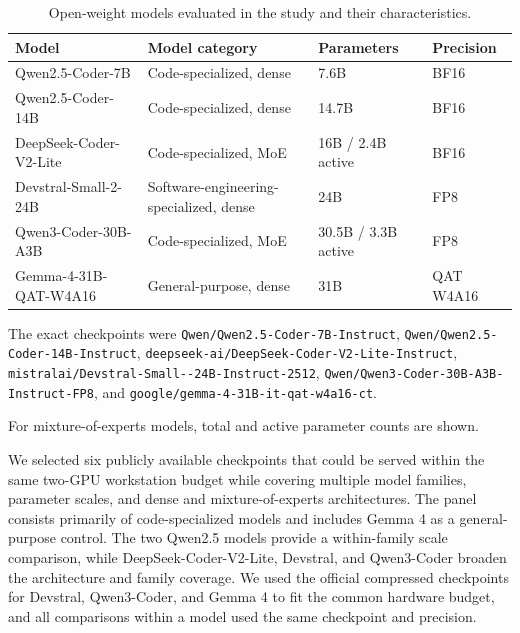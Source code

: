 \begin{table}[H]
\caption{Open-weight models evaluated in the study and their characteristics.}
\label{tab:models}
\centering
\begingroup
\scriptsize
\renewcommand{\arraystretch}{1.12}

\begin{threeparttable}

\begin{tabularx}{0.98\columnwidth}{
    >{\raggedright\arraybackslash}p{}
    >{\raggedright\arraybackslash}X
    >{\centering\arraybackslash}p{}
    >{\centering\arraybackslash}p{}
}
\toprule
\textbf{Model}\tnote{a} &
\textbf{Model category} &
\textbf{Parameters}\tnote{b} &
\textbf{Precision} \\
\midrule
Qwen2.5-Coder-7B & Code-specialized, dense & 7.6B & BF16 \\
Qwen2.5-Coder-14B & Code-specialized, dense & 14.7B & BF16 \\
DeepSeek-Coder-V2-Lite & Code-specialized, MoE & 16B / 2.4B active & BF16 \\
Devstral-Small-2-24B & Software-engineering-specialized, dense & 24B & FP8 \\
Qwen3-Coder-30B-A3B & Code-specialized, MoE & 30.5B / 3.3B active & FP8 \\
Gemma-4-31B-QAT-W4A16 & General-purpose, dense & 31B & QAT W4A16 \\
\bottomrule
\end{tabularx}

\begin{tablenotes}[flushleft]
\footnotesize
\item[a]
The exact checkpoints were
\texttt{Qwen/Qwen2.5-Coder-\allowbreak 7B-Instruct},
\texttt{Qwen/Qwen2.5-Coder-\allowbreak 14B-Instruct},
\texttt{deepseek-ai/DeepSeek-Coder-\allowbreak V2-Lite-Instruct},
\texttt{mistralai/Devstral-Small--24B-Instruct-2512},
\texttt{Qwen/Qwen3-Coder-\allowbreak 30B-A3B-Instruct-FP8}, and
\texttt{google/gemma-4-\allowbreak 31B-it-qat-w4a16-ct}.
\item[b]
For mixture-of-experts models, total and active parameter counts are shown.
\end{tablenotes}

\end{threeparttable}
\endgroup
\end{table}
\unskip

We selected six publicly available checkpoints that could be served within the same two-GPU workstation budget while covering multiple model families, parameter scales, and dense and mixture-of-experts architectures.
The panel consists primarily of code-specialized models and includes Gemma 4 as a general-purpose control.
The two Qwen2.5 models provide a within-family scale comparison, while DeepSeek-Coder-V2-Lite, Devstral, and Qwen3-Coder broaden the architecture and family coverage.
We used the official compressed checkpoints for Devstral, Qwen3-Coder, and Gemma 4 to fit the common hardware budget, and all comparisons within a model used the same checkpoint and precision.

